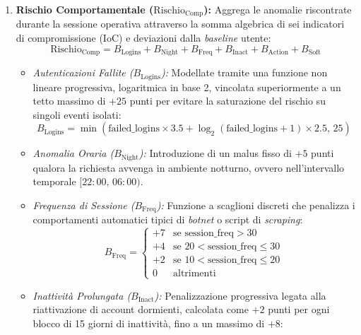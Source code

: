 \begin{enumerate}
    \item \textbf{Rischio Comportamentale ($\text{Rischio}_{\text{Comp}}$):} Aggrega le anomalie riscontrate durante la sessione operativa attraverso la somma algebrica di sei indicatori di compromissione (IoC) e deviazioni dalla \textit{baseline} utente:
    \begin{equation}
        \text{Rischio}_{\text{Comp}} = B_{\text{Logins}} + B_{\text{Night}} + B_{\text{Freq}} + B_{\text{Inact}} + B_{\text{Action}} + B_{\text{Soft}}
    \end{equation}
    \begin{itemize}
        \item \textit{Autenticazioni Fallite ($B_{\text{Logins}}$):} Modellate tramite una funzione non lineare progressiva, logaritmica in base 2, vincolata superiormente a un tetto massimo di $+25$ punti per evitare la saturazione del rischio su singoli eventi isolati:
        \begin{equation}
            B_{\text{Logins}} = \min\left( \text{failed\_logins} \times 3.5 + \log_2(\text{failed\_logins} + 1) \times 2.5, \, 25 \right)
        \end{equation}
        \item \textit{Anomalia Oraria ($B_{\text{Night}}$):} Introduzione di un malus fisso di $+5$ punti qualora la richiesta avvenga in ambiente notturno, ovvero nell'intervallo temporale $[22:00, \, 06:00)$.
        \item \textit{Frequenza di Sessione ($B_{\text{Freq}}$):} Funzione a scaglioni discreti che penalizza i comportamenti automatici tipici di \textit{botnet} o script di \textit{scraping}:
        \begin{equation}
            B_{\text{Freq}} = \begin{cases} 
                +7 & \text{se } \text{session\_freq} > 30 \\
                +4 & \text{se } 20 < \text{session\_freq} \le 30 \\
                +2 & \text{se } 10 < \text{session\_freq} \le 20 \\
                0 & \text{altrimenti}
            \end{cases}
        \end{equation}
        \item \textit{Inattività Prolungata ($B_{\text{Inact}}$):} Penalizzazione progressiva legata alla riattivazione di account dormienti, calcolata come $+2$ punti per ogni blocco di 15 giorni di inattività, fino a un massimo di $+8$:

\end{itemize}
\end{enumerate}
